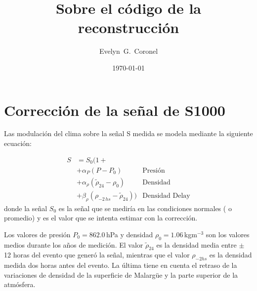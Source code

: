 
\usepackage{physics}


\title{Sobre el código de la reconstrucción}
\author{Evelyn~G.~Coronel}


\date[]{\lowercase{\today}} %


\maketitle

\section{Corrección  de la señal de S1000}

Las modulación del clima sobre la señal S medida se modela mediante la siguiente ecuación:

\begin{align*}
    S &= S_0 (1 +\\
          &+ \alpha_P(P - P_0)  &\text{Presión}\\
          &+ \alpha_\rho(\tilde{\rho}_{24} - \rho_0) &\text{Densidad}\\ 
          &+ \beta_\rho(\rho_{-2\,hs} - \tilde{\rho}_{24} )) &\text{Densidad Delay}
\end{align*}
donde la señal $S_0$ es la señal  que se mediría en las condiciones normales ( o promedio) y es el valor que se intenta estimar con la corrección. 

Los valores de presión $P_0=862.0\,$hPa y densidad $\rho_0=1.06\,$kgm$^{-3}$ son los valores medios durante los años de medición. El valor $\tilde{\rho}_{24}$ es la densidad media entre $\pm$ 12 horas del evento que generó la señal, mientras que el valor $\rho_{-2hs}$ es la densidad medida dos horas antes del evento. La última tiene en cuenta el retraso de la variaciones de densidad de la superficie de Malargüe y la parte superior de la atmósfera.

